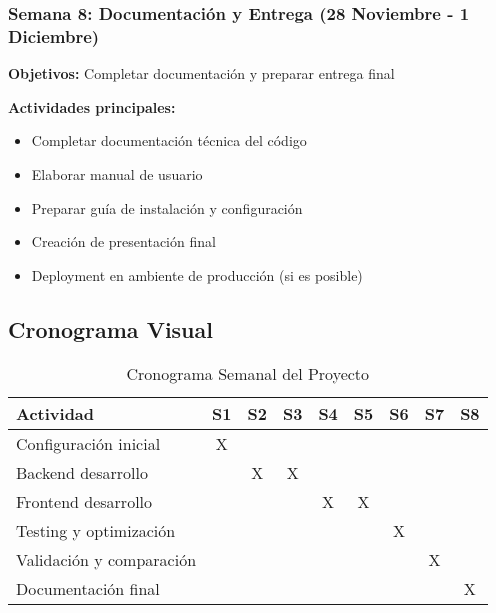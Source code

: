 \subsubsection{Semana 8: Documentación y Entrega (28 Noviembre - 1 Diciembre)}
\textbf{Objetivos:} Completar documentación y preparar entrega final

\textbf{Actividades principales:}
\begin{itemize}
    \item Completar documentación técnica del código
    \item Elaborar manual de usuario
    \item Preparar guía de instalación y configuración
    \item Creación de presentación final
    \item Deployment en ambiente de producción (si es posible)
\end{itemize}

\subsection{Cronograma Visual}

\begin{table}[H]
    \centering
    \small
    \begin{tabular}{|l|c|c|c|c|c|c|c|c|}
        \hline
        \textbf{Actividad} & \textbf{S1} & \textbf{S2} & \textbf{S3} & \textbf{S4} & \textbf{S5} & \textbf{S6} & \textbf{S7} & \textbf{S8} \\
        \hline
        Configuración inicial & X & & & & & & & \\
        \hline
        Backend desarrollo & & X & X & & & & & \\
        \hline
        Frontend desarrollo & & & & X & X & & & \\
        \hline
        Testing y optimización & & & & & & X & & \\
        \hline
        Validación y comparación & & & & & & & X & \\
        \hline
        Documentación final & & & & & & & & X \\
        \hline
    \end{tabular}
    \caption{Cronograma Semanal del Proyecto}
    \label{tab:cronograma_semanal}
\end{table}

